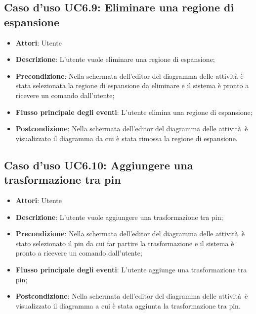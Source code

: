 \documentclass[../AnalisiDeiRequisiti.tex]{subfiles}
\begin{document}
				\subsection{Caso d'uso UC6.9: Eliminare una regione di espansione}
				\begin{itemize}
					\item \textbf{Attori}: Utente
					\item \textbf{Descrizione}: L'utente vuole eliminare una regione di espansione;
					\item \textbf{Precondizione}: Nella schermata dell'editor del diagramma delle attività è stata selezionata la regione di espansione da eliminare e il sistema è pronto a ricevere un comando dall'utente;
					\item \textbf{Flusso principale degli eventi}: L'utente elimina una regione di espansione;
					\item \textbf{Postcondizione}: Nella schermata dell'editor del diagramma delle attività è visualizzato il diagramma da cui è stata rimossa la regione di espansione.
				\end{itemize}
				\subsection{Caso d'uso UC6.10: Aggiungere una trasformazione tra pin}
				\begin{itemize}
					\item \textbf{Attori}: Utente
					\item \textbf{Descrizione}: L'utente vuole aggiungere una trasformazione tra pin;
					\item \textbf{Precondizione}: Nella schermata dell'editor del diagramma delle attività è stato selezionato il pin da cui far partire la trasformazione e il sistema è pronto a ricevere un comando dall'utente;
					\item \textbf{Flusso principale degli eventi}: L'utente aggiunge una trasformazione tra pin;
					\item \textbf{Postcondizione}: Nella schermata dell'editor del diagramma delle attività è visualizzato il diagramma a cui è stata aggiunta la trasformazione tra pin.
				\end{itemize}
\end{document}
